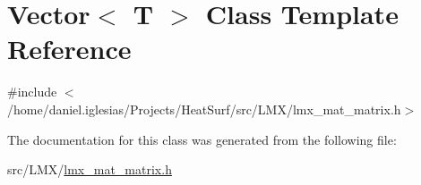 \hypertarget{classVector}{\section{Vector$<$ T $>$ Class Template Reference}
\label{classVector}
}


{\ttfamily \#include $<$/home/daniel.\-iglesias/\-Projects/\-Heat\-Surf/src/\-L\-M\-X/lmx\-\_\-mat\-\_\-matrix.\-h$>$}



The documentation for this class was generated from the following file\-:\begin{DoxyCompactItemize}
\item 
src/\-L\-M\-X/\hyperlink{lmx__mat__matrix_8h}{lmx\-\_\-mat\-\_\-matrix.\-h}\end{DoxyCompactItemize}

